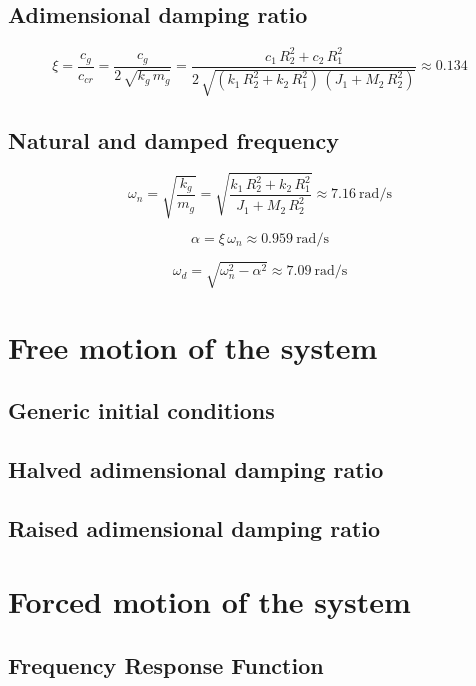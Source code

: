 \documentclass[a4paper,12pt,oneside]{article}
\begin{document}
\subsection{Adimensional damping ratio}

\[
\xi = \frac{c_g}{c_{cr}} = %
  \frac{c_g}{2 \, \sqrt{k_g \, m_g}} %
  = \frac{c_1 \, R_2^2 + c_2 \, R_1^2} %
  {2 \, \sqrt{(k_1 \, R_2^2 + k_2 \, R_1^2) \, (J_1 + M_2 \, R_2^2)}} %
  \approx 0.134
\]

\subsection{Natural and damped frequency}

\[
\omega_n = \sqrt{\frac{k_g}{m_g}} = %
  \sqrt{\frac{k_1 \, R_2^2 + k_2 \, R_1^2}{J_1 + M_2 \, R_2^2}} %
  \approx 7.16 ~ \text{rad/s}
\]

\[ \alpha = \xi \, \omega_n \approx 0.959 ~ \text{rad/s} \]

\[ \omega_d = \sqrt{\omega_n^2 - \alpha^2} \approx 7.09 ~ \text{rad/s} \]

\section{Free motion of the system}



\subsection{Generic initial conditions}



\subsection{Halved adimensional damping ratio}



\subsection{Raised adimensional damping ratio}



\section{Forced motion of the system}



\subsection{Frequency Response Function}
\end{document}
